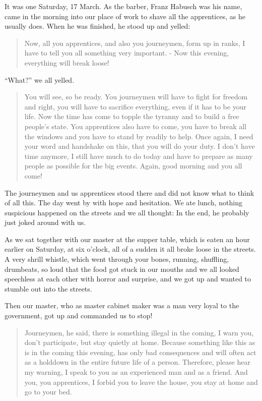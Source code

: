 It was one Saturday, 17 March. As the barber, Franz Habusch was his name, came in the morning into our place of work to shave all the apprentices, as he usually does. When he was finished, he stood up and yelled:

\begin{quote}
Now, all you apprentices, and also you journeymen, form up in ranks, I have to tell you all something very important. - Now this evening, everything will break loose!
\end{quote}

``What?'' we all yelled.

\begin{quote}
You will see, so be ready. You journeymen will have to fight for freedom and right, you will have to sacrifice everything, even if it has to be your life. Now the time has come to topple the tyranny and to build a free people's state. You apprentices also have to come, you have to break all the windows and you have to stand by readily to help. Once again, I need your word and handshake on this, that you will do your duty. I don't have time anymore, I still have much to do today and have to prepare as many people as possible for the big events. Again, good morning and you all come!
\end{quote}

The journeymen and us apprentices stood there and did not know what to think of all this. The day went by with hope and hesitation. We ate lunch, nothing suspicious happened on the streets and we all thought: In the end, he probably just joked around with us.

As we sat together with our master at the supper table, which is eaten an hour earlier on Saturday, at six o'clock, all of a sudden it all broke loose in the streets. A very shrill whistle, which went through your bones, running, shuffling, drumbeats, so loud that the food got stuck in our mouths and we all looked speechless at each other with horror and surprise, and we got up and wanted to stumble out into the streets.

Then our master, who as master cabinet maker was a man very loyal to the government, got up and commanded us to stop!

\begin{quote}
Journeymen, he said, there is something illegal in the coming, I warn you, don't participate, but stay quietly at home. Because something like this as is in the coming this evening, has only bad consequences and will often act as a holddown in the entire future life of a person. Therefore, please hear my warning, I speak to you as an experienced man and as a friend. And you, you apprentices, I forbid you to leave the house, you stay at home and go to your bed.
\end{quote}


